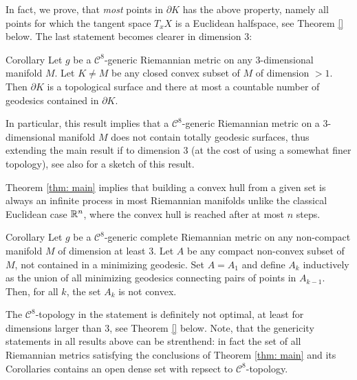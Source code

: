 \documentclass[a4paper,10pt]{article}
\begin{document}
  
In fact, we prove, that  \emph{most} points in $\partial K$ has the above property, namely all points for which the tangent space $T_xX$ is a Euclidean halfspace, see Theorem \ref{} below.  The last statement becomes clearer in dimension $3$:

\begin{thm}{Corollary}
  Let $g$ be a $\mathcal C^8$-generic Riemannian metric on any $3$-dimensional manifold $M$.
  Let $K\neq M$ be any closed convex subset of $M$ of dimension $>1$.  Then $\partial K$ is a topological surface and there at most a countable number of geodesics contained  in $\partial K$. 
\end{thm}     

 
In particular, this result implies that a $\mathcal C^8$-generic Riemannian metric on a $3$-dimensional manifold $M$ does not contain
totally geodesic surfaces, thus extending the main result if \cite[Theorem A]{Wilhelm} to dimension $3$  (at the cost of using a somewhat finer topology), see also \cite{Bryant} for a sketch of this result.


Theorem \ref{thm: main} implies that  building a convex hull from a given set  is always an infinite process in most Riemannian manifolds unlike the classical Euclidean case $\mathbb{R}^n$, where 
the convex hull is reached after at most $n$ steps.

\begin{thm}{Corollary}
 Let $g$ be a $\mathcal C^8$-generic complete Riemannian metric on any non-compact  manifold $M$ of dimension 
 at least $3$.  Let $A$ be any compact non-convex  subset of $M$, not contained in a minimizing  geodesic. Set $A=A_1$ and define  $A_k$ inductively as  the union of all minimizing geodesics connecting pairs of  points in 
$A_{k-1}$.  Then, for all $k$, the set $A_k$ is not  convex.
\end{thm}





The  $\mathcal C^8$-topology in the statement is definitely not optimal, at least for dimensions larger than $3$, see Theorem \ref{} below.  Note, that the genericity statements in all results above can be strenthend: in fact the set of all Riemannian metrics   
satisfying the conclusions of Theorem \ref{thm: main} and its Corollaries contains an open dense set with repsect to $\mathcal C^8$-topology.
\end{document}
